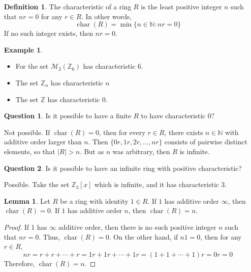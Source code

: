 \documentclass[11pt]{article}
\theoremstyle{definition}\newtheorem{definition}{Definition}
\theoremstyle{definition}\newtheorem*{notation}{Notation}
\theoremstyle{definition}\newtheorem{example}{Example}
\theoremstyle{theorem}\newtheorem{theorem}{Theorem}
\theoremstyle{theorem}\newtheorem{corollary}{Corollary}
\theoremstyle{theorem}\newtheorem{proposition}{Proposition}
\theoremstyle{theorem}\newtheorem{lemma}{Lemma}
\theoremstyle{theorem}\newtheorem{question}{Question}
\theoremstyle{remark}\newtheorem{remark}{Remark}
\newcommand{\Z}{\mathbb{Z}}
\newcommand{\N}{\mathbb{N}}
\newcommand{\M}{\mathcal{M}}
\DeclareMathOperator{\Char}{char}
\begin{document}
\begin{definition}
    The characteristic of a ring $R$ is the least positive integer $n$ such that $nr = 0$ for any $r \in R$. In other words,
    \begin{equation*}
        \Char(R) = \min\{n \in \N : nr = 0\}
    \end{equation*}
    If no such integer exists, then $nr = 0$.
\end{definition}

\begin{example}
    \begin{itemize}
        \item For the set $\M_2(\Z_6)$ has characteristic 6.
        \item The set $\Z_n$ has characteristic $n$
        \item The set $\Z$ has characteristic 0.
    \end{itemize}
\end{example}

\begin{question}
    Is it possible to have a finite $R$ to have characteristic 0?
\end{question}

Not possible. If $\Char(R) = 0$, then for every $r \in R$, there exists $n \in \N$ with additive order larger than $n$. Then $\{0r, 1r, 2r,..., nr\}$ consists of pairwise distinct elements, so that $|R| > n$. But as $n$ was arbitrary, then $R$ is infinite.

\begin{question}
    Is it possible to have an infinite ring with positive characteristic?
\end{question}

Possible. Take the set $\Z_3[x]$ which is infinite, and it has characteristic 3.

\begin{lemma}
    Let $R$ be a ring with identity $1 \in R$. If $1$ has additive order $\infty$, then $\Char(R) = 0$. If $1$ has additive order $n$, then $\Char(R) = n$.
\end{lemma}

\begin{proof}
    If 1 has $\infty$ additive order, then there is no such positive integer $n$ such that $nr = 0$. Thus, $\Char(R) = 0$. On the other hand, if $n1 = 0$, then for any $r \in R$,
    \begin{equation*}
        nr = r + r + \cdots + r = 1r + 1r + \cdots + 1r = (1 + 1 + \cdots + 1)r = 0r = 0
    \end{equation*}
    Therefore, $\Char(R) = n$.
\end{proof}
\end{document}
